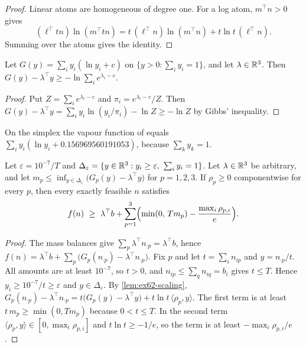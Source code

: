 \begin{proof}
Linear atoms are homogeneous of degree one.
For a log atom, $m^\top n>0$ gives
\[
(\ell^\top tn)\ln(m^\top tn)=t\,(\ell^\top n)\ln(m^\top n)+t\ln t\,(\ell^\top n).
\]
Summing over the atoms gives the identity.
\end{proof}

\begin{lemma}\label{lem:ex62-ideal}
Let $G(y)=\sum_i y_i(\ln y_i+c)$ on $\{y>0:\sum_iy_i=1\}$, and let $\lambda\in\mathbb{R}^3$.
Then $G(y)-\lambda^\top y\ge-\ln\sum_ie^{\lambda_i-c}$.
\end{lemma}

\begin{proof}
Put $Z=\sum_ie^{\lambda_i-c}$ and $\pi_i=e^{\lambda_i-c}/Z$.
Then $G(y)-\lambda^\top y=\sum_iy_i\ln(y_i/\pi_i)-\ln Z\ge-\ln Z$ by Gibbs' inequality.
\end{proof}

On the simplex the vapour function of  equals $\sum_i y_i(\ln y_i+0.156969560191053)$, because $\sum_k y_k=1$.

\begin{proposition}\label{prop:ex62-dual}
Let $\varepsilon=10^{-7}/T$ and $\Delta_\varepsilon=\{y\in\R^3:y_i\ge\varepsilon,\ \sum_iy_i=1\}$.
Let $\lambda\in\mathbb{R}^3$ be arbitrary, and let $m_p\le\inf_{y\in\Delta_\varepsilon}\bigl(G_p(y)-\lambda^\top y\bigr)$ for $p=1,2,3$.
If $\rho_p\ge0$ componentwise for every $p$, then every exactly feasible $n$ satisfies
\begin{equation}\label{eq:ex62-bound}
f(n)\ \ge\ \lambda^\top b+\sum_{p=1}^{3}\Bigl(\min(0,\,T m_p)-\frac{\max_i \rho_{p,i}}{e}\Bigr).
\end{equation}
\end{proposition}

\begin{proof}
The mass balances give $\sum_p\lambda^\top n_{\cdot p}=\lambda^\top b$, hence
$f(n)=\lambda^\top b+\sum_p\bigl(G_p(n_{\cdot p})-\lambda^\top n_{\cdot p}\bigr)$.
Fix $p$ and let $t=\sum_in_{ip}$ and $y=n_{\cdot p}/t$.
All amounts are at least $10^{-7}$, so $t>0$, and $n_{ip}\le\sum_qn_{iq}=b_i$ gives $t\le T$.
Hence $y_i\ge10^{-7}/t\ge\varepsilon$ and $y\in\Delta_\varepsilon$.
By \cref{lem:ex62-scaling},
$G_p(n_{\cdot p})-\lambda^\top n_{\cdot p}=t\bigl(G_p(y)-\lambda^\top y\bigr)+t\ln t\,\langle \rho_p,y\rangle$.
The first term is at least $t\,m_p\ge\min(0,Tm_p)$ because $0<t\le T$.
In the second term $\langle \rho_p,y\rangle\in[0,\max_i\rho_{p,i}]$ and $t\ln t\ge-1/e$, so the term is at least $-\max_i\rho_{p,i}/e$.
\end{proof}

